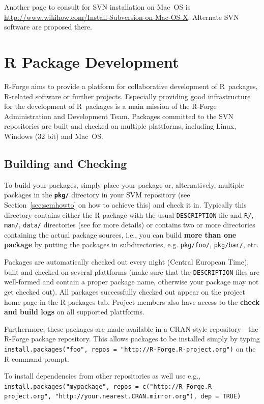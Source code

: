 \documentclass[a4paper]{article}
\newcommand{\RFORGE}{R-Forge Administration and Development Team}
\let\code=\texttt
\newcommand{\proglang}[1]{\textsf{#1}}
\begin{document}
Another page to consult for SVN installation on Mac~OS is
\url{http://www.wikihow.com/Install-Subversion-on-Mac-OS-X}. Alternate SVN
software are proposed there. 

\section{R Package Development}

R-Forge aims to provide a platform for collaborative development of
\proglang{R}~packages, \proglang{R}-related software or further
projects. Especially providing good infrastructure for the development of
\proglang{R}~packages is a main mission of the \RFORGE{}. Packages
committed to the SVN repositories are built and checked on multiple
plattforms, including Linux, Windows (32 bit) and Mac~OS. 

\subsection{Building and Checking}
To build your packages, simply place your package or, alternatively,
multiple packages in the
\textbf{\texttt{pkg/}} directory in your SVM repository (see 
Section~\ref{sec:scmhowto} on how to achieve this) and check it
in. Typically this directory contains either the R package with the usual
\texttt{DESCRIPTION} file and \texttt{R/}, \texttt{man/},
\texttt{data/} directories (see \cite{Rcore:writing_R_extensions} for more
details) or contains two or more directories containing the actual
package sources, i.e., you can build \textbf{more than one package} by
putting the packages in subdirectories, e.g. \texttt{pkg/foo/}, 
\texttt{pkg/bar/}, etc.

Packages are automatically checked out every night (Central European
Time), built and checked on several plattforms (make sure that the
\texttt{DESCRIPTION} files are well-formed and contain a proper 
package name, otherwise your package may not get checked out). All
packages successfully checked out appear on the project home page in
the \proglang{R} packages tab. Project members also have access to the
\textbf{check and build logs} on all supported plattforms.  

Furthermore, these packages are made available in a CRAN-style
repository---the
R-Forge package repository. This allows packages to be installed simply by
typing \texttt{install.packages("foo", repos = "http://R-Forge.R-project.org")}
on the \proglang{R} command prompt. 

To install dependencies from other repositories as well use e.g.,
\code{install.packages("mypackage", repos = c("http://R-Forge.R-project.org",
"http://your.nearest.CRAN.mirror.org"), dep = TRUE)}
\end{document}
